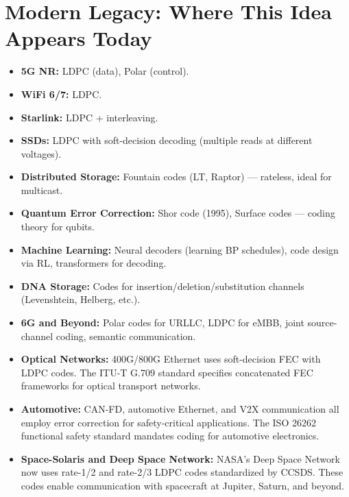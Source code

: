 \section{Modern Legacy: Where This Idea Appears Today}
\label{sec:ec:legacy}

\begin{itemize}
\item \textbf{5G NR:} LDPC (data), Polar (control).
\item \textbf{WiFi 6/7:} LDPC.
\item \textbf{Starlink:} LDPC + interleaving.
\item \textbf{SSDs:} LDPC with soft-decision decoding (multiple reads at different voltages).
\item \textbf{Distributed Storage:} Fountain codes (LT, Raptor) — rateless, ideal for multicast.
\item \textbf{Quantum Error Correction:} Shor code (1995), Surface codes — coding theory for qubits.
\item \textbf{Machine Learning:} Neural decoders (learning BP schedules), code design via RL, transformers for decoding.
\item \textbf{DNA Storage:} Codes for insertion/deletion/substitution channels (Levenshtein, Helberg, etc.).
\item \textbf{6G and Beyond:} Polar codes for URLLC, LDPC for eMBB, joint source-channel coding, semantic communication.
\item \textbf{Optical Networks:} 400G/800G Ethernet uses soft-decision FEC with LDPC codes. The ITU-T G.709 standard specifies concatenated FEC frameworks for optical transport networks.
\item \textbf{Automotive:} CAN-FD, automotive Ethernet, and V2X communication all employ error correction for safety-critical applications. The ISO 26262 functional safety standard mandates coding for automotive electronics.
\item \textbf{Space-Solaris and Deep Space Network:} NASA's Deep Space Network now uses rate-1/2 and rate-2/3 LDPC codes standardized by CCSDS. These codes enable communication with spacecraft at Jupiter, Saturn, and beyond.
\end{itemize}

